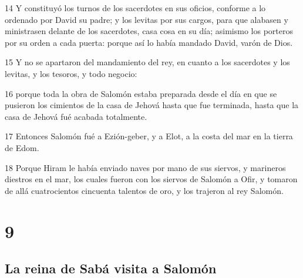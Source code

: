 \par 14 Y constituyó los turnos de los sacerdotes en sus oficios, conforme a lo ordenado por David su padre; y los levitas por sus cargos, para que alabasen y ministrasen delante de los sacerdotes, casa cosa en su día; asimismo los porteros por su orden a cada puerta: porque así lo había mandado David, varón de Dios.
\par 15 Y no se apartaron del mandamiento del rey, en cuanto a los sacerdotes y los levitas, y los tesoros, y todo negocio:
\par 16 porque toda la obra de Salomón estaba preparada desde el día en que se pusieron los cimientos de la casa de Jehová hasta que fue terminada, hasta que la casa de Jehová fué acabada totalmente.
\par 17 Entonces Salomón fué a Ezión-geber, y a Elot, a la costa del mar en la tierra de Edom.
\par 18 Porque Hiram le había enviado naves por mano de sus siervos, y marineros diestros en el mar, los cuales fueron con los siervos de Salomón a Ofir, y tomaron de allá cuatrocientos cincuenta talentos de oro, y los trajeron al rey Salomón.

\chapter{9}

\section*{La reina de Sabá visita a Salomón }

